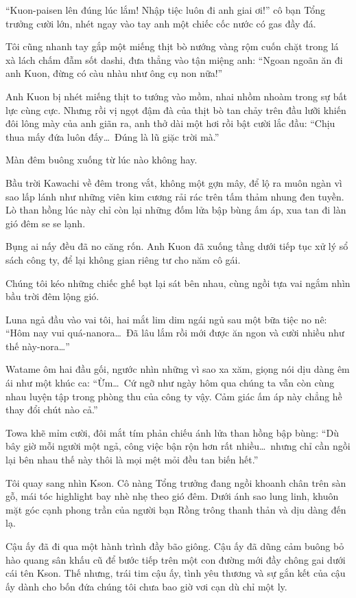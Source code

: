 \documentclass[../main.tex]{subfiles}
\begin{document}
``Kuon-paisen lên đúng lúc lắm! Nhập tiệc luôn đi anh giai ơi!'' cô bạn Tổng trưởng cười lớn, nhét ngay vào tay anh một chiếc cốc nước có gas đầy đá.

Tôi cũng nhanh tay gắp một miếng thịt bò nướng vàng rộm cuốn chặt trong lá xà lách chấm đẫm sốt dashi, đưa thẳng vào tận miệng anh: ``Ngoan ngoãn ăn đi anh Kuon, đừng có càu nhàu như ông cụ non nữa!''

Anh Kuon bị nhét miếng thịt to tướng vào mồm, nhai nhồm nhoàm trong sự bất lực cùng cực. Nhưng rồi vị ngọt đậm đà của thịt bò tan chảy trên đầu lưỡi khiến đôi lông mày của anh giãn ra, anh thở dài một hơi rồi bật cười lắc đầu: ``Chịu thua mấy đứa luôn đấy\dots\ Đúng là lũ giặc trời mà.''

\ct

Màn đêm buông xuống từ lúc nào không hay.

Bầu trời Kawachi về đêm trong vắt, không một gợn mây, để lộ ra muôn ngàn vì sao lấp lánh như những viên kim cương rải rác trên tấm thảm nhung đen tuyền. Lò than hồng lúc này chỉ còn lại những đốm lửa bập bùng ấm áp, xua tan đi làn gió đêm se se lạnh.

Bụng ai nấy đều đã no căng rốn. Anh Kuon đã xuống tầng dưới tiếp tục xử lý sổ sách công ty, để lại không gian riêng tư cho năm cô gái.

Chúng tôi kéo những chiếc ghế bạt lại sát bên nhau, cùng ngồi tựa vai ngắm nhìn bầu trời đêm lộng gió.

Luna ngả đầu vào vai tôi, hai mắt lim dim ngái ngủ sau một bữa tiệc no nê: ``Hôm nay vui quá-nanora\dots\ Đã lâu lắm rồi mới được ăn ngon và cười nhiều như thế này-nora\dots''

Watame ôm hai đầu gối, ngước nhìn những vì sao xa xăm, giọng nói dịu dàng êm ái như một khúc ca: ``Ừm\dots\ Cứ ngỡ như ngày hôm qua chúng ta vẫn còn cùng nhau luyện tập trong phòng thu của công ty vậy. Cảm giác ấm áp này chẳng hề thay đổi chút nào cả.''

Towa khẽ mỉm cười, đôi mắt tím phản chiếu ánh lửa than hồng bập bùng: ``Dù bây giờ mỗi người một ngả, công việc bận rộn hơn rất nhiều\dots\ nhưng chỉ cần ngồi lại bên nhau thế này thôi là mọi mệt mỏi đều tan biến hết.''

Tôi quay sang nhìn Kson. Cô nàng Tổng trưởng đang ngồi khoanh chân trên sàn gỗ, mái tóc highlight bay nhè nhẹ theo gió đêm. Dưới ánh sao lung linh, khuôn mặt góc cạnh phong trần của người bạn Rồng trông thanh thản và dịu dàng đến lạ.

Cậu ấy đã đi qua một hành trình đầy bão giông. Cậu ấy đã dũng cảm buông bỏ hào quang sân khấu cũ để bước tiếp trên một con đường mới đầy chông gai dưới cái tên Kson. Thế nhưng, trái tim cậu ấy, tình yêu thương và sự gắn kết của cậu ấy dành cho bốn đứa chúng tôi chưa bao giờ vơi cạn dù chỉ một ly.
\end{document}
